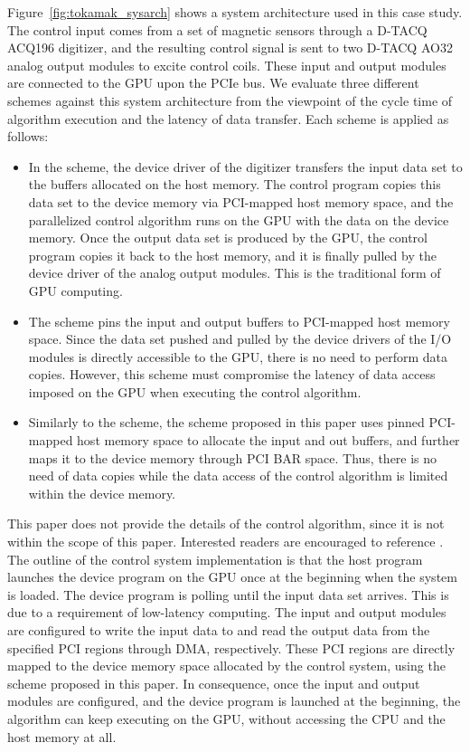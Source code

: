 Figure~\ref{fig:tokamak_sysarch} shows a system architecture used in
this case study.
The control input comes from a set of magnetic sensors through a D-TACQ
ACQ196 digitizer, and the resulting control signal is sent to two D-TACQ
AO32 analog output modules to excite control coils.
These input and output modules are connected to the GPU upon the PCIe
bus.
We evaluate three different schemes against this system architecture
from the viewpoint of the cycle time of algorithm execution and the
latency of data transfer. 
Each scheme is applied as follows:
\begin{itemize}
 \item In the {\hd} scheme, the device driver of the digitizer transfers
       the input data set to the buffers allocated on the host memory.
       The control program copies this data set to the device memory via
       PCI-mapped host memory space, and the parallelized control
       algorithm runs on the GPU with the data on the device memory.
       Once the output data set is produced by the GPU, the control
       program copies it back to the host memory, and it is finally
       pulled by the device driver of the analog output modules.
       This is the traditional form of GPU computing.
 \item The {\hp} scheme pins the input and output buffers to PCI-mapped
       host memory space.
       Since the data set pushed and pulled by the device drivers of
       the I/O modules is directly accessible to the GPU, there is no
       need to perform data copies.
       However, this scheme must compromise the latency of data access
       imposed on the GPU when executing the control algorithm.
 \item Similarly to the {\hp} scheme, the {\dm} scheme proposed in this
       paper uses pinned PCI-mapped host memory space to allocate the
       input and out buffers, and further maps it to the device memory
       through PCI BAR space.
       Thus, there is no need of data copies while the data access of
       the control algorithm is limited within the device memory.
\end{itemize}

This paper does not provide the details of the control algorithm, since
it is not within the scope of this paper.
Interested readers are encouraged to reference \cite{Boozer_PP99}.
The outline of the control system implementation is that the host
program launches the device program on the GPU once at the beginning
when the system is loaded.
The device program is polling until the input data set arrives.
This is due to a requirement of low-latency computing.
The input and output modules are configured to write the input data to
and read the output data from the specified PCI regions through DMA,
respectively.
These PCI regions are directly mapped to the device memory space
allocated by the control system, using the {\dm} scheme proposed in this
paper.
In consequence, once the input and output modules are configured, and
the device program is launched at the beginning, the algorithm can keep
executing on the GPU, without accessing the CPU and the host memory at
all.

